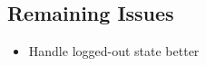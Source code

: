 \documentclass[oneside, english, final]{design}
\begin{document}
\subsection{Remaining Issues}
\begin{itemize}
      \item{Handle logged-out state better}
      
\end{itemize}
      
\end{document}
